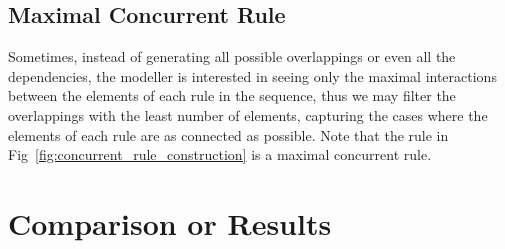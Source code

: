           \subsection{Maximal Concurrent Rule}

          Sometimes, instead of generating all possible overlappings or even all the dependencies, the modeller is interested in seeing only the maximal interactions between the elements of each rule in the sequence, thus we may filter the overlappings with the least number of elements, capturing the cases where the elements of each rule are as connected as possible. Note that the rule in Fig~\ref{fig:concurrent_rule_construction} is a maximal concurrent rule.


\section{Comparison or Results}
